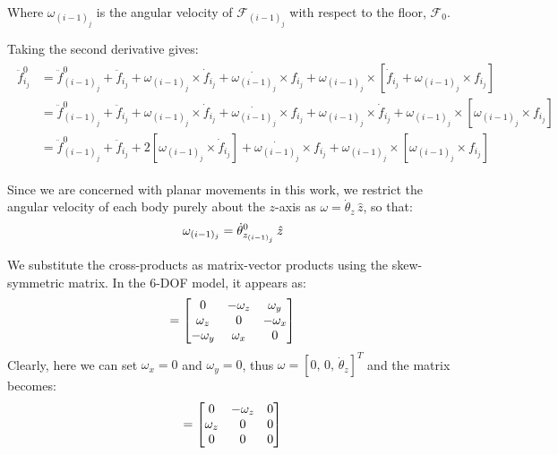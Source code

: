 Where $\omega_{(i-1)_j}$ is the angular velocity \cite{Ginsberg1984_AdvancedDynamics} of $\mathcal{F}_{(i-1)_j}$ with respect to the floor, $\mathcal{F}_{0}$.

Taking the second derivative gives:
\begin{align}
    \begin{split}
        \ddot{f}^{0}_{i_j} &= \ddot{f}^{0}_{(i-1)_j} + \ddot{f}_{i_j}
        + \omega_{(i-1)_j} \times \dot{f}_{i_j}
        + \dot{\omega_{(i-1)_j}} \times f_{i_j}
        + \omega_{(i-1)_j} \times \left[
            \dot{f}_{i_j} + \omega_{(i-1)_j} \times f_{i_j}
        \right] \\
        &= \ddot{f}^{0}_{(i-1)_j} + \ddot{f}_{i_j}
        + \omega_{(i-1)_j} \times \dot{f}_{i_j}
        + \dot{\omega_{(i-1)_j}} \times f_{i_j}
        + \omega_{(i-1)_j} \times \dot{f}_{i_j}
        + \omega_{(i-1)_j} \times \left[
            \omega_{(i-1)_j} \times f_{i_j}
        \right] \\
        &= \ddot{f}^{0}_{(i-1)_j} + \ddot{f}_{i_j}
        + 2 \left[ \omega_{(i-1)_j} \times \dot{f}_{i_j} \right]
        + \dot{\omega_{(i-1)_j}} \times f_{i_j}
        + \omega_{(i-1)_j} \times \left[
            \omega_{(i-1)_j} \times f_{i_j}
        \right]
    \end{split}
\end{align}

Since we are concerned with planar movements in this work, we restrict the angular velocity of each body purely about the $z$-axis as $\omega = \dot{\theta}_z\,\hat{z}$, so that:
\begin{equation}
    \omega_{(i-1)_j} = \dot{\theta}^{0}_{z_{(i-1)_j}}\,\hat{z} \notag
\end{equation}

We substitute the cross-products as matrix-vector products using the skew-symmetric matrix. In the 6-DOF model\cite{Al-Rawashdeh2022_Caracterization}, it appears as:
\begin{equation}
    [\omega]
    =
    \begin{bmatrix}
        0 & -\omega_z & \omega_y \\
        \omega_z & 0 & -\omega_x \\
        -\omega_y & \omega_x & 0
    \end{bmatrix}
    \notag
\end{equation}
Clearly, here we can set $\omega_x = 0$ and $\omega_y = 0$, thus $\omega = [0,\, 0,\, \dot{\theta}_z]^T$ and the matrix becomes:
\begin{equation}
    [\omega]
    =
    \begin{bmatrix}
        0 & -\omega_z & 0 \\
        \omega_z & 0 & 0 \\
        0 & 0 & 0
    \end{bmatrix}
    \notag
\end{equation}

